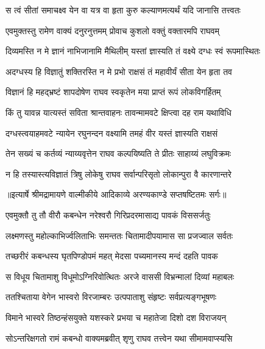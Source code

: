\twolineshloka
{स त्वं सीतां समाचक्ष्व येन वा यत्र वा हृता}
{कुरु कल्याणमत्यर्थं यदि जानासि तत्त्वतः} %

\twolineshloka
{एवमुक्तस्तु रामेण वाक्यं दनुरनुत्तमम्}
{प्रोवाच कुशलो वक्तुं वक्तारमपि राघवम्} %

\twolineshloka
{दिव्यमस्ति न मे ज्ञानं नाभिजानामि मैथिलीम्}
{यस्तां ज्ञास्यति तं वक्ष्ये दग्धः स्वं रूपमास्थितः} %

\twolineshloka
{अदग्धस्य हि विज्ञातुं शक्तिरस्ति न मे प्रभो}
{राक्षसं तं महावीर्यं सीता येन हृता तव} %

\twolineshloka
{विज्ञानं हि महद्भ्रष्टं शापदोषेण राघव}
{स्वकृतेन मया प्राप्तं रूपं लोकविगर्हितम्} %

\twolineshloka
{किं तु यावन्न यात्यस्तं सविता श्रान्तवाहनः}
{तावन्मामवटे क्षिप्त्वा दह राम यथाविधि} %

\twolineshloka
{दग्धस्त्वयाहमवटे न्यायेन रघुनन्दन}
{वक्ष्यामि तमहं वीर यस्तं ज्ञास्यति राक्षसं} %

\twolineshloka
{तेन सख्यं च कर्तव्यं न्याय्यवृत्तेन राघव}
{कल्पयिष्यति ते प्रीतः साहाय्यं लघुविक्रमः} %

\twolineshloka
{न हि तस्यास्त्यविज्ञातं त्रिषु लोकेषु राघव}
{सर्वान्परिसृतो लोकान्पुरा वै कारणान्तरे} %


{॥इत्यार्षे श्रीमद्रामायणे वाल्मीकीये आदिकाव्ये अरण्यकाण्डे सप्तषष्टितमः सर्गः॥}


\twolineshloka
{एवमुक्तौ तु तौ वीरौ कबन्धेन नरेश्वरौ}
{गिरिप्रदरमासाद्य पावकं विससर्जतुः} %

\twolineshloka
{लक्ष्मणस्तु महोल्काभिर्ज्वलिताभिः समन्ततः}
{चितामादीपयामास सा प्रजज्वाल सर्वतः} %

\twolineshloka
{तच्छरीरं कबन्धस्य घृतपिण्डोपमं महत्}
{मेदसा पच्यमानस्य मन्दं दहति पावक} %

\twolineshloka
{स विधूय चितामाशु विधूमोऽग्निरिवोत्थितः}
{अरजे वाससी विभ्रन्मालां दिव्यां महाबलः} %

\twolineshloka
{ततश्चिताया वेगेन भास्वरो विरजाम्बरः}
{उत्पपाताशु संहृष्टः सर्वप्रत्यङ्गभूषणः} %

\twolineshloka
{विमाने भास्वरे तिष्ठन्हंसयुक्ते यशस्करे}
{प्रभया च महातेजा दिशो दश विराजयन्} %

\twolineshloka
{सोऽन्तरिक्षगतो रामं कबन्धो वाक्यमब्रवीत्}
{शृणु राघव तत्त्वेन यथा सीमामवाप्स्यसि} %

